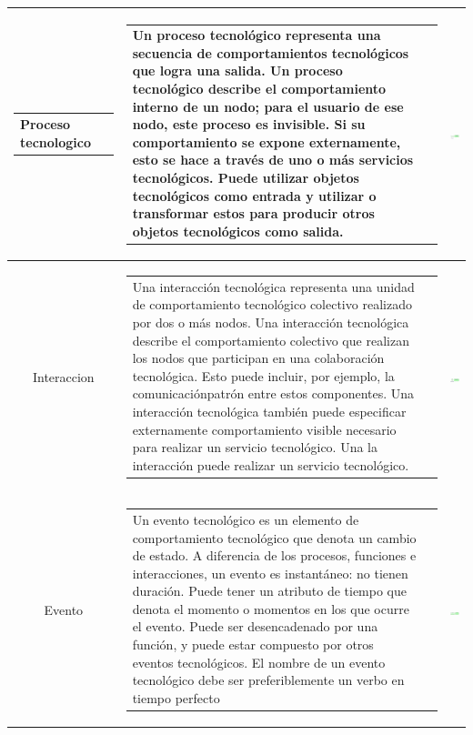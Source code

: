 \begin{longtable}{|c|c|c|}
	\begin{tabular}{p{2cm}p{3cm}}
		Proceso tecnologico
	\end{tabular}
	&
	\begin{tabular}{p{8cm}p{3cm}} 
		Un proceso tecnológico representa una secuencia de comportamientos tecnológicos que logra una salida. Un proceso tecnológico describe el comportamiento interno de un nodo; para el usuario de ese nodo, este proceso es invisible. Si su comportamiento se expone externamente, esto se hace a través de uno o más servicios tecnológicos. Puede utilizar objetos tecnológicos como entrada y utilizar o transformar estos para producir otros objetos tecnológicos como salida.
	\end{tabular}
	& \includegraphics[width=0.2\linewidth, height=0.05\textheight]{imgs/conceptos/tecnologica/procesoTecnologia}
	\\
	\hline
	
	Interaccion 
	&
	\begin{tabular}{p{8cm}p{3cm}} 
		Una interacción tecnológica representa una unidad de comportamiento tecnológico colectivo realizado por dos o más nodos. Una interacción tecnológica describe el comportamiento colectivo que realizan los nodos que participan en una colaboración tecnológica. Esto puede incluir, por ejemplo, la comunicaciónpatrón entre estos componentes. Una interacción tecnológica también puede especificar externamente comportamiento visible necesario para realizar un servicio tecnológico. Una la interacción puede realizar un servicio tecnológico.
	\end{tabular}
	& \includegraphics[width=0.2\linewidth, height=0.05\textheight]{imgs/conceptos/tecnologica/InteraccionTecnologia}
	\\
	\hline
	
	Evento 
	&
	\begin{tabular}{p{8cm}p{3cm}} 
		Un evento tecnológico es un elemento de comportamiento tecnológico que denota un cambio de estado. A diferencia de los procesos, funciones e interacciones, un evento es instantáneo: no tienen duración. Puede tener un atributo de tiempo que denota el momento o momentos en los que ocurre el evento. Puede ser desencadenado por una función, y puede estar compuesto por otros eventos tecnológicos. El nombre de un evento tecnológico debe ser preferiblemente un verbo en tiempo perfecto 
	\end{tabular}
	& \includegraphics[width=0.2\linewidth, height=0.05\textheight]{imgs/conceptos/tecnologica/eventoTecnologia}
	\\
	\hline
	

\end{longtable}
